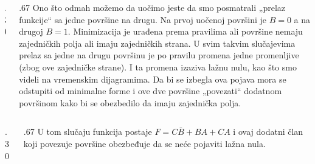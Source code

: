 \begin{frame}[label=02-s053]
\gusttekst
\begin{columns}[c,onlytextwidth]
\begin{column}{.30\textwidth}\centering

\end{column}
\begin{column}{.67\textwidth}
Ono što odmah možemo da uočimo jeste da smo posmatrali „prelaz funkcije“ sa jedne površine na drugu. Na prvoj uočenoj površini je \(B=0\) a na drugoj \(B=1\). Minimizacija je urađena prema pravilima ali površine nemaju zajedničkih polja ali imaju zajedničkih strana. U svim takvim slučajevima prelaz sa jedne na drugu površinu je po pravilu promena jedne promenljive (zbog ove zajedničke strane). I ta promena izaziva lažnu nulu, kao što smo videli na vremenskim dijagramima. Da bi se izbegla ova pojava mora se odstupiti od minimalne forme i ove dve površine „povezati“ dodatnom površinom kako bi se obezbedilo da imaju zajednička polja.
\end{column}
\end{columns}
\begin{columns}[c,onlytextwidth]
\begin{column}{.30\textwidth}\centering

\end{column}
\begin{column}{.67\textwidth}
U tom slučaju funkcija postaje \(F=C\bar B+BA+CA\) i ovaj dodatni član koji povezuje površine obezbeđuje da se neće pojaviti lažna nula.
\end{column}
\end{columns}
\end{frame}
